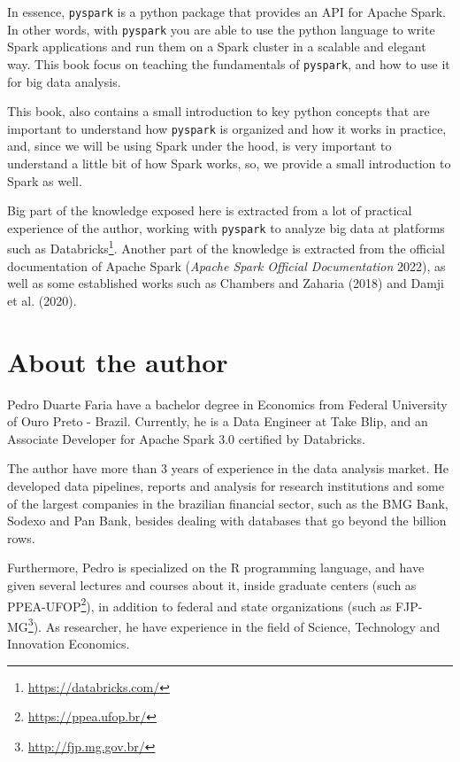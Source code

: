 \documentclass[
  11pt,
  letterpaper,
  DIV=11,
  numbers=noendperiod]{scrreprt}
\begin{document}

In essence, \texttt{pyspark} is a python package that provides an API
for Apache Spark. In other words, with \texttt{pyspark} you are able to
use the python language to write Spark applications and run them on a
Spark cluster in a scalable and elegant way. This book focus on teaching
the fundamentals of \texttt{pyspark}, and how to use it for big data
analysis.

This book, also contains a small introduction to key python concepts
that are important to understand how \texttt{pyspark} is organized and
how it works in practice, and, since we will be using Spark under the
hood, is very important to understand a little bit of how Spark works,
so, we provide a small introduction to Spark as well.

Big part of the knowledge exposed here is extracted from a lot of
practical experience of the author, working with \texttt{pyspark} to
analyze big data at platforms such as Databricks\footnote{\url{https://databricks.com/}}.
Another part of the knowledge is extracted from the official
documentation of Apache Spark (\emph{Apache Spark Official
Documentation} 2022), as well as some established works such as Chambers
and Zaharia (2018) and Damji et al. (2020).

\hypertarget{about-the-author}{%
\section*{About the author}\label{about-the-author}}


Pedro Duarte Faria have a bachelor degree in Economics from Federal
University of Ouro Preto - Brazil. Currently, he is a Data Engineer at
Take Blip, and an Associate Developer for Apache Spark 3.0 certified by
Databricks.

The author have more than 3 years of experience in the data analysis
market. He developed data pipelines, reports and analysis for research
institutions and some of the largest companies in the brazilian
financial sector, such as the BMG Bank, Sodexo and Pan Bank, besides
dealing with databases that go beyond the billion rows.

Furthermore, Pedro is specialized on the R programming language, and
have given several lectures and courses about it, inside graduate
centers (such as PPEA-UFOP\footnote{\url{https://ppea.ufop.br/}}), in
addition to federal and state organizations (such as FJP-MG\footnote{\url{http://fjp.mg.gov.br/}}).
As researcher, he have experience in the field of Science, Technology
and Innovation Economics.
\end{document}
